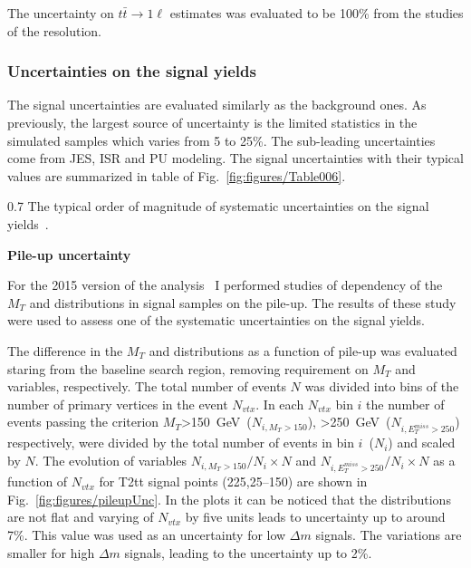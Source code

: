 The uncertainty on $t\bar{t} \to 1\ell$ estimates was evaluated to be 100\% from the studies of the \MET resolution.

\subsubsection{Uncertainties on the signal yields}

The signal uncertainties are evaluated similarly as the background ones.  As previously, the largest source of uncertainty is the limited statistics in the simulated samples which varies from 5 to 25\%. The sub-leading uncertainties come from JES, ISR and PU modeling. The signal uncertainties with their typical values are summarized in table of Fig.~\ref{fig:figures/Table006}.

                 {0.7}       %
                 { The typical order of magnitude of systematic uncertainties on the signal yields~\cite{Sirunyan:2017xse}. }

\textbf{Pile-up uncertainty}

For the 2015 version of the analysis~\cite{Sirunyan:2016jpr} I performed studies of dependency of the $M_{T}$ and \MET distributions in signal samples on the pile-up. The results of these study were used to assess one of the systematic uncertainties on the signal yields.

The difference in the $M_{T}$ and \MET distributions as a function of pile-up was evaluated staring from the baseline search region, removing requirement on $M_{T}$ and \MET variables, respectively. The total number of events $N$ was divided into bins of the number of primary vertices in the event $N_{vtx}$. In each $N_{vtx}$ bin $i$ the number of events passing the criterion $M_{T}$>150~GeV~($N_{i,M_{T}>150}$), \MET>250~GeV~($N_{i,E_{T}^{miss}>250}$) respectively, were divided by the total number of events in bin $i$~($N_{i}$) and scaled by $N$. The evolution of variables $N_{i,M_{T}>150}/N_{i} \times N$ and $N_{i,E_{T}^{miss}>250}/N_{i} \times N$ as a function of $N_{vtx}$ for T2tt signal points (225,25--150) are shown in Fig.~\ref{fig:figures/pileupUnc}. In the plots it can be noticed that  the distributions are not flat and varying of $N_{vtx}$ by five units leads to uncertainty up to around 7\%. This value was used as an uncertainty for low $\Delta m$ signals. The variations are smaller for high $\Delta m$ signals, leading to the uncertainty up to 2\%.

